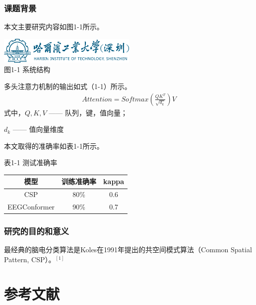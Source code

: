 \documentclass[14pt]{article}
\begin{document}
\subsubsection{课题背景}
本文主要研究内容如图1-1所示。
\begin{center}
    \includegraphics[width=0.5\textwidth]{hitsz.png}\\
     图1-1 系统结构
\end{center}
\par
多头注意力机制的输出如式（1-1）所示。
\begin{align}
    Attention=Softmax(\frac{QK^T}{\sqrt{d_k}})V \tag{1-1}
\end{align}
式中，$Q,K,V \text{ —— 队列，键，值向量}$；
\par
\hspace{0.2cm} $d_k \text{ —— 值向量维度}$
\par
本文取得的准确率如表1-1所示。
\begin{center}
     表1-1 测试准确率\\
    \begin{tabular}{ccc}
        \toprule
        模型 & 训练准确率 & kappa\\
        \midrule
        CSP & 80\% & 0.6\\
        EEGConformer & 90\% & 0.7\\
        \bottomrule
    \end{tabular}
\end{center}
\subsubsection{研究的目的和意义}
最经典的脑电分类算法是Koles在1991年提出的共空间模式算法（Common Spatial Pattern, CSP）。$^{[1]}$

\newpage
\section*{参考文献}
\end{document}
